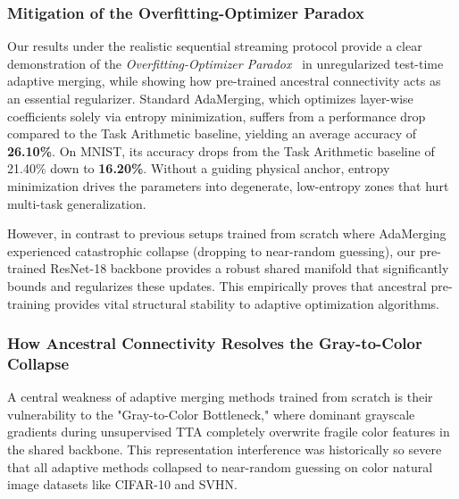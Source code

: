 \subsubsection{Mitigation of the Overfitting-Optimizer Paradox}
Our results under the realistic sequential streaming protocol provide a clear demonstration of the \emph{Overfitting-Optimizer Paradox}~\cite{overfittingoptimizerparadox} in unregularized test-time adaptive merging, while showing how pre-trained ancestral connectivity acts as an essential regularizer. Standard AdaMerging, which optimizes layer-wise coefficients solely via entropy minimization, suffers from a performance drop compared to the Task Arithmetic baseline, yielding an average accuracy of \textbf{26.10\%}. On MNIST, its accuracy drops from the Task Arithmetic baseline of 21.40\% down to \textbf{16.20\%}. Without a guiding physical anchor, entropy minimization drives the parameters into degenerate, low-entropy zones that hurt multi-task generalization. 

However, in contrast to previous setups trained from scratch where AdaMerging experienced catastrophic collapse (dropping to near-random guessing), our pre-trained ResNet-18 backbone provides a robust shared manifold that significantly bounds and regularizes these updates. This empirically proves that ancestral pre-training provides vital structural stability to adaptive optimization algorithms.

\subsubsection{How Ancestral Connectivity Resolves the Gray-to-Color Collapse}
A central weakness of adaptive merging methods trained from scratch is their vulnerability to the "Gray-to-Color Bottleneck," where dominant grayscale gradients during unsupervised TTA completely overwrite fragile color features in the shared backbone. This representation interference was historically so severe that all adaptive methods collapsed to near-random guessing on color natural image datasets like CIFAR-10 and SVHN.

